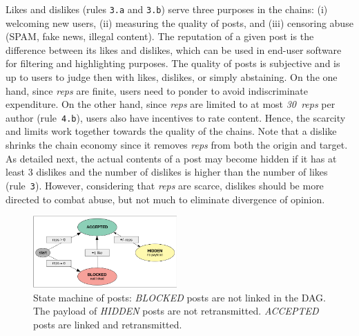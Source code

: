 \documentclass[10pt,journal,compsoc]{IEEEtran}
\newcommand{\reps}     {\emph{reps}\xspace}
\newcommand{\nreps}[1] {\emph{#1~reps\xspace}}
\begin{document}
Likes and dislikes (rules \texttt{3.a} and \texttt{3.b}) serve three purposes
in the chains:
    (i) welcoming new users,
    (ii) measuring the quality of posts, and
    (iii) censoring abuse (SPAM, fake news, illegal content).
%
The reputation of a given post is the difference between its likes and
dislikes, which can be used in end-user software for filtering and highlighting
purposes.
%
The quality of posts is subjective and is up to users to judge then with likes,
dislikes, or simply abstaining.
On the one hand, since \reps are finite, users need to ponder to avoid
indiscriminate expenditure.
On the other hand, since \reps are limited to at most \nreps{30} per author
(rule~\texttt{4.b}), users also have incentives to rate content.
Hence, the scarcity and limits work together towards the quality of the chains.
%
Note that a dislike shrinks the chain economy since it removes \reps from both
the origin and target.
As detailed next, the actual contents of a post may become hidden if it has at
least 3 dislikes and the number of dislikes is higher than the number of likes
(rule~\texttt{3}).
However, considering that \reps are scarce, dislikes should be more directed to
combat abuse, but not much to eliminate divergence of opinion.

\begin{figure}
\centering
\includegraphics[width=0.49\textwidth]{state.png}
\caption{
    State machine of posts:
    \emph{BLOCKED} posts are not linked in the DAG.
    The payload of \emph{HIDDEN} posts are not retransmitted.
    \emph{ACCEPTED} posts are linked and retransmitted.
}
\label{fig.state}
\end{figure}
\end{document}
